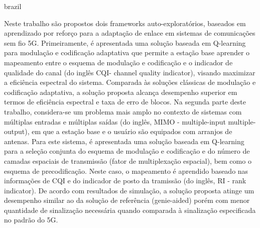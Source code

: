 \begin{resumo}[Resumo]
\begin{otherlanguage*}{brazil}

\setlength\parindent{24pt}
Neste trabalho são propostos dois frameworks auto-exploratórios, baseados em aprendizado por reforço para a adaptação de enlace em sistemas de comunicações sem fio 5G.
%
Primeiramente, é apresentada uma solução baseada em Q-learning para modulação e codificação adaptativa que permite a estação base aprender o mapeamento entre o esquema de modulação e codificação e o indicador de qualidade do canal (do inglês CQI- channel quality indicator), visando maximizar a eficiência espectral do sistema.
%
Comparada às soluções clássicas de modulação e codificação adaptativa, a solução proposta alcança desempenho superior em termos de eficiência espectral e taxa de erro de blocos.
%
Na segunda parte deste trabalho, considera-se um problema mais amplo no contexto de sistemas com múltiplas entradas e múltiplas saídas (do inglês, MIMO - multiple-input multiple-output), em que a estação base e o usuário são equipados com arranjos de antenas.
%
Para este sistema, é apresentada uma solução baseada em Q-learning para a seleção conjunta do esquema de modulação e codificação e do número de camadas espaciais de transmissão (fator de multiplexação espacial), bem como o esquema de precodificação.
%
Neste caso, o mapeamento é aprendido baseado nas informações de CQI e do indicador de posto da tramissão (do inglês, RI - rank indicator).
%
De acordo com resultados de simulação, a solução proposta atinge um desempenho similar ao da solução de referência (genie-aided) porém com menor quantidade de sinalização necessária quando comparada à sinalização especificada no padrão do 5G.


\end{otherlanguage*}
\end{resumo}
